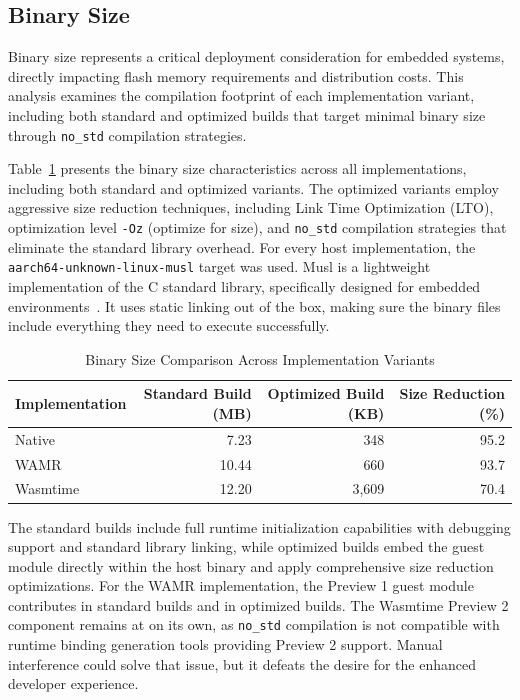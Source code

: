 \subsection{Binary Size}
\label{subsec:binary-size}

Binary size represents a critical deployment consideration for embedded systems, directly impacting flash memory requirements and distribution costs. This analysis examines the compilation footprint of each implementation variant, including both standard and optimized builds that target minimal binary size through \texttt{no\_std} compilation strategies.

Table~\ref{tab:binary-sizes} presents the binary size characteristics across all implementations, including both standard and optimized variants. The optimized variants employ aggressive size reduction techniques, including Link Time Optimization (LTO), optimization level \texttt{-Oz} (optimize for size), and \texttt{no\_std} compilation strategies that eliminate the standard library overhead. For every host implementation, the \texttt{aarch64-unknown-linux-musl} target was used. Musl is a lightweight implementation of the C standard library, specifically designed for embedded environments~\cite{musl}. It uses static linking out of the box, making sure the binary files include everything they need to execute successfully.

\begin{table}[H]
\centering
\caption{Binary Size Comparison Across Implementation Variants}
\label{tab:binary-sizes}
\begin{tabular}{lrrr}
\toprule
\textbf{Implementation} & \textbf{Standard Build (MB)} & \textbf{Optimized Build (KB)} & \textbf{Size Reduction (\%)} \\
\midrule
Native              & 7.23  & 348   & 95.2 \\
WAMR                & 10.44 & 660   & 93.7 \\
Wasmtime            & 12.20 & 3,609 & 70.4 \\
\bottomrule
\end{tabular}
\end{table}

The standard builds include full runtime initialization capabilities with debugging support and standard library linking, while optimized builds embed the guest module directly within the host binary and apply comprehensive size reduction optimizations. For the WAMR implementation, the Preview 1 guest module contributes  in standard builds and  in optimized builds. The Wasmtime Preview 2 component remains at  on its own, as \texttt{no\_std} compilation is not compatible with runtime binding generation tools providing Preview 2 support. Manual interference could solve that issue, but it defeats the desire for the enhanced developer experience.


